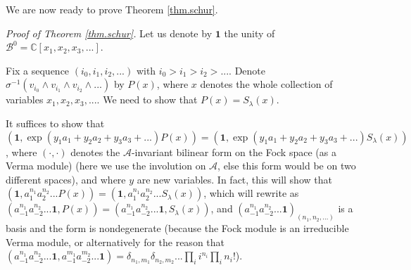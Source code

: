 \documentclass
[numbers=enddot,12pt,final,onecolumn,german,notitlepage]{scrartcl}%
\theoremstyle{definition}
\begin{document}
We are now ready to prove Theorem \ref{thm.schur}.

\textit{Proof of Theorem \ref{thm.schur}.} Let us denote by $\mathbf{1}$ the
unity of $\mathcal{B}^{0}=\mathbb{C}\left[  x_{1},x_{2},x_{3},...\right]  $.

Fix a sequence $\left(  i_{0},i_{1},i_{2},...\right)  $ with $i_{0}%
>i_{1}>i_{2}>...$. Denote $\sigma^{-1}\left(  v_{i_{0}}\wedge v_{i_{1}}\wedge
v_{i_{2}}\wedge...\right)  $ by $P\left(  x\right)  $, where $x$ denotes the
whole collection of variables $x_{1},x_{2},x_{3},...$. We need to show that
$P\left(  x\right)  =S_{\lambda}\left(  x\right)  $.

It suffices to show that $\left(  \mathbf{1},\exp\left(  y_{1}a_{1}+y_{2}%
a_{2}+y_{3}a_{3}+...\right)  P\left(  x\right)  \right)  =\left(
\mathbf{1},\exp\left(  y_{1}a_{1}+y_{2}a_{2}+y_{3}a_{3}+...\right)
S_{\lambda}\left(  x\right)  \right)  $, where $\left(  \cdot,\cdot\right)  $
denotes the $\mathcal{A}$-invariant bilinear form on the Fock space (as a
Verma module) (here we use the involution on $\mathcal{A}$, else this form
would be on two different spaces), and where $y$ are new variables. In fact,
this will show that $\left(  \mathbf{1},a_{1}^{n_{1}}a_{2}^{n_{2}}...P\left(
x\right)  \right)  =\left(  \mathbf{1},a_{1}^{n_{1}}a_{2}^{n_{2}}%
...S_{\lambda}\left(  x\right)  \right)  $, which will rewrite as $\left(
a_{-1}^{n_{1}}a_{-2}^{n_{2}}...\mathbf{1},P\left(  x\right)  \right)  =\left(
a_{-1}^{n_{1}}a_{-2}^{n_{2}}...\mathbf{1},S_{\lambda}\left(  x\right)
\right)  $, and $\left(  a_{-1}^{n_{1}}a_{-2}^{n_{2}}...\mathbf{1}\right)
_{\left(  n_{1},n_{2},...\right)  }$ is a basis and the form is nondegenerate
(because the Fock module is an irreducible Verma module, or alternatively for
the reason that $\left(  a_{-1}^{n_{1}}a_{-2}^{n_{2}}...\mathbf{1}%
,a_{-1}^{m_{1}}a_{-2}^{m_{2}}...\mathbf{1}\right)  =\delta_{n_{1},m_{1}}%
\delta_{n_{2},m_{2}}...\prod\limits_{i}i^{n_{i}}\prod\limits_{i}n_{i}!$).
\end{document}
